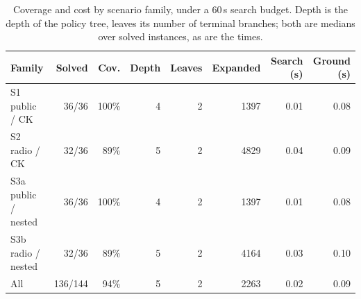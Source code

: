 \begin{table}[H]
\centering
\small
\caption{Coverage and cost by scenario family, under a 60\,s search budget.
Depth is the depth of the policy tree, leaves its number of terminal branches;
both are medians over solved instances, as are the times.}
\label{tab:coverage}
\begin{tabular}{@{}l r r r r r r r@{}}
\toprule
\textbf{Family} & \textbf{Solved} & \textbf{Cov.} & \textbf{Depth} & \textbf{Leaves}
 & \textbf{Expanded} & \textbf{Search (s)} & \textbf{Ground (s)} \\
\midrule
S1 public / CK & 36/36 & 100\% & 4 & 2 & 1397 & 0.01 & 0.08 \\
S2 radio / CK & 32/36 & 89\% & 5 & 2 & 4829 & 0.04 & 0.09 \\
S3a public / nested & 36/36 & 100\% & 4 & 2 & 1397 & 0.01 & 0.08 \\
S3b radio / nested & 32/36 & 89\% & 5 & 2 & 4164 & 0.03 & 0.10 \\
\midrule
All & 136/144 & 94\% & 5 & 2 & 2263 & 0.02 & 0.09 \\
\bottomrule
\end{tabular}
\end{table}
